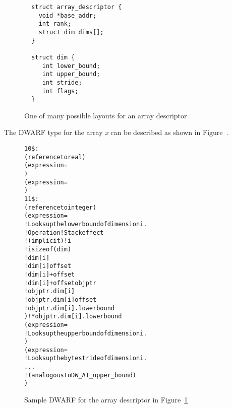 \begin{figure}[!h]
\begin{lstlisting}
  struct array_descriptor {
    void *base_addr;
    int rank;
    struct dim dims[]; 
  }

  struct dim {
     int lower_bound;
     int upper_bound;
     int stride;
     int flags;
  }
\end{lstlisting}
\caption{One of many possible layouts for an array descriptor}
\label{fig:arraydesc}
\end{figure}

The DWARF type for the array \emph{x} can be described as shown in
Figure~.

\begin{figure}[!h]
\begin{dwflisting}
\begin{alltt}
10\$:  \DWTAGarraytype
         \DWATtype(reference to real)
         \DWATrank(expression=
             \DWOPpushobjectaddress
             \DWOPplus
             \DWOPderef)
         \DWATdatalocation(expression=
             \DWOPpushobjectaddress
             \DWOPplus
             \DWOPderef)
11\$:    \DWTAGgenericsubrange
             \DWATtype(reference to integer)
             \DWATlowerbound(expression=
             !   Looks up the lower bound of dimension i.
             !   Operation                              ! Stack effect
             !   (implicit)                             ! i                                                                     
                      ! i sizeof(dim)
                 \DWOPmult                             ! dim[i]
                  ! dim[i] offset
                 \DWOPplus                             ! dim[i]+offset
                 \DWOPpushobjectaddress              ! dim[i]+offset objptr
                 \DWOPplus                             ! objptr.dim[i]
                  ! objptr.dim[i] offset
                 \DWOPplus                             ! objptr.dim[i].lowerbound
                 \DWOPderef)                           ! *objptr.dim[i].lowerbound
             \DWATupperbound(expression=
             !   Looks up the upper bound of dimension i.
                 \DWOPmult
                 \DWOPplus
                 \DWOPpushobjectaddress
                 \DWOPplus
                 \DWOPplus
                 \DWOPderef)
             \DWATbytestride(expression=
             !   Looks up the byte stride of dimension i.
                 ...
             !   (analogous to DW\_AT\_upper\_bound)
                 )
\end{alltt}
\end{dwflisting}
\caption{Sample DWARF for the array descriptor in Figure~\ref{fig:arraydesc}}
\label{fig:assumedrankdwarf}
\end{figure}

